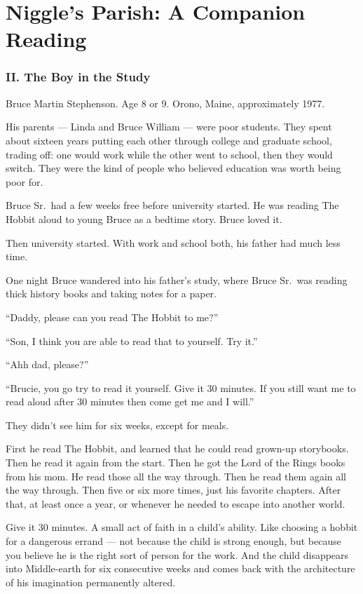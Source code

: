 \chapter{Niggle's Parish: A Companion Reading}
\label{app:niggle-companion}

\subsection*{II. The Boy in the Study}
\label{spine:so-the-boy-in-the-study}

Bruce Martin Stephenson. Age 8 or 9. Orono, Maine, approximately 1977.

His parents --- Linda and Bruce William --- were poor students. They spent about sixteen years putting each other through college and graduate school, trading off: one would work while the other went to school, then they would switch. They were the kind of people who believed education was worth being poor for.

Bruce Sr.\ had a few weeks free before university started. He was reading The Hobbit aloud to young Bruce as a bedtime story. Bruce loved it.

Then university started. With work and school both, his father had much less time.

One night Bruce wandered into his father's study, where Bruce Sr.\ was reading thick history books and taking notes for a paper.

``Daddy, please can you read The Hobbit to me?''

``Son, I think you are able to read that to yourself. Try it.''

``Ahh dad, please?''

``Brucie, you go try to read it yourself. Give it 30 minutes. If you still want me to read aloud after 30 minutes then come get me and I will.''

They didn't see him for six weeks, except for meals.

First he read The Hobbit, and learned that he could read grown-up storybooks. Then he read it again from the start. Then he got the Lord of the Rings books from his mom. He read those all the way through. Then he read them again all the way through. Then five or six more times, just his favorite chapters. After that, at least once a year, or whenever he needed to escape into another world.

Give it 30 minutes. A small act of faith in a child's ability. Like choosing a hobbit for a dangerous errand --- not because the child is strong enough, but because you believe he is the right sort of person for the work. And the child disappears into Middle-earth for six consecutive weeks and comes back with the architecture of his imagination permanently altered.


